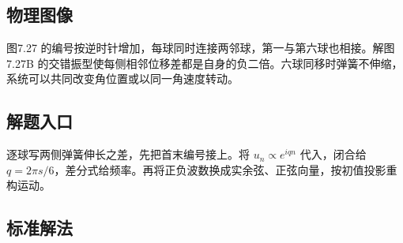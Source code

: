 \documentclass[UTF8,fontset=fandol,a4paper,11pt]{ctexart}
\begin{document}
\subsection*{物理图像}

图7.27 的编号按逆时针增加，每球同时连接两邻球，第一与第六球也相接。解图7.27B 的交错振型使每侧相邻位移差都是自身的负二倍。六球同移时弹簧不伸缩，系统可以共同改变角位置或以同一角速度转动。




\subsection*{解题入口}

逐球写两侧弹簧伸长之差，先把首末编号接上。将 $u_n\propto e^{iqn}$ 代入，闭合给 $q=2\pi s/6$，差分式给频率。再将正负波数换成实余弦、正弦向量，按初值投影重构运动。



\subsection*{标准解法}
\end{document}
